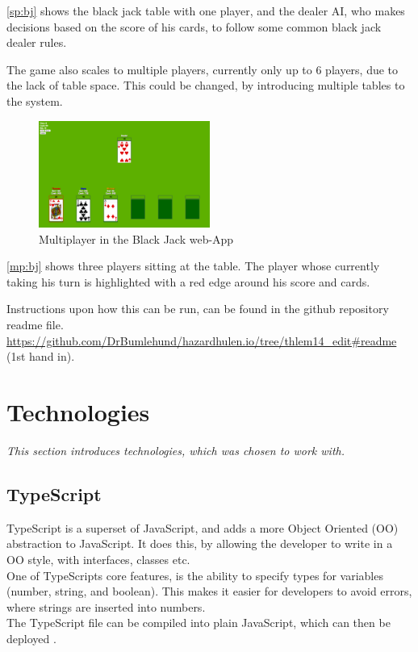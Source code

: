\documentclass[a4paper]{article}
\begin{document}
\autoref{sp:bj} shows the black jack table with one player, and the dealer AI, who makes decisions based on the score of his cards, to follow some common black jack dealer rules.

The game also scales to multiple players, currently only up to 6 players, due to the lack of table space. This could be changed, by introducing multiple tables to the system.

\begin{figure}[hbt]
  \centering
  \includegraphics[width=0.5\textwidth]{images/multiplayer}	
  \caption{Multiplayer in the Black Jack web-App}
  \label{mp:bj}
\end{figure}

\autoref{mp:bj} shows three players sitting at the table. The player whose currently taking his turn is highlighted with a red edge around his score and cards.

Instructions upon how this can be run, can be found in the github repository readme file. \url{https://github.com/DrBumlehund/hazardhulen.io/tree/thlem14_edit#readme} (1st hand in).




\section{Technologies}
\label{sec_tech}
\textit{This section introduces technologies, which was chosen to work with.}
\subsection{TypeScript}
TypeScript is a superset of JavaScript, and adds a more Object Oriented (OO) abstraction to JavaScript. It does this, by allowing the developer to write in a OO style, with interfaces, classes etc.\\
One of TypeScripts core features, is the ability to specify types for variables (number, string, and boolean). This makes it easier for developers to avoid errors, where strings are inserted into numbers.\\
The TypeScript file can be compiled into plain JavaScript, which can then be deployed \cite{tsc}.
\end{document}

